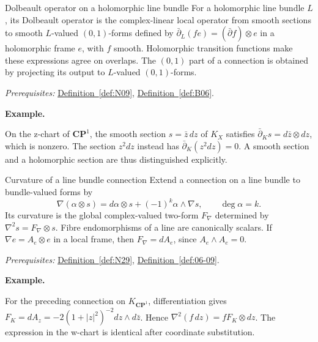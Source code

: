 \documentclass[11pt]{article}
\makeatletter
\newcounter{definition}
\newcommand{\CP}{\mathbf{CP}}
\newcommand{\exampleheading}{\par\medskip\textbf{Example.}\par\smallskip}
\newcommand{\currentdefinition}[1]{\protected@edef\@currentlabel{#1}}
\makeatother
\begin{document}
\begin{definitionbox}{Dolbeault operator on a holomorphic line bundle}
\currentdefinition{\thedefinition}
\label{def:B08}
For a holomorphic line bundle $L$, its Dolbeault operator is the complex-linear local operator from smooth sections to smooth $L$-valued $(0,1)$-forms defined by $\bar\partial_L(fe)=(\bar\partial f)\otimes e$ in a holomorphic frame $e$, with $f$ smooth. Holomorphic transition functions make these expressions agree on overlaps. The $(0,1)$ part of a connection is obtained by projecting its output to $L$-valued $(0,1)$-forms.

\smallskip
\textit{Prerequisites:} \hyperref[def:N09]{Definition~\ref*{def:N09}}, \hyperref[def:B06]{Definition~\ref*{def:B06}}.

\exampleheading
On the z-chart of $\CP^1$, the smooth section $s=\bar z\,dz$ of $K_X$ satisfies $\bar\partial_Ks=d\bar z\otimes dz$, which is nonzero. The section $z^2dz$ instead has $\bar\partial_K(z^2dz)=0$. A smooth section and a holomorphic section are thus distinguished explicitly.
\end{definitionbox}

\begin{definitionbox}{Curvature of a line bundle connection}
\currentdefinition{\thedefinition}
\label{def:B09}
Extend a connection on a line bundle to bundle-valued forms by
\[\nabla(\alpha\otimes s)=d\alpha\otimes s+(-1)^k\alpha\wedge\nabla s,\qquad\deg\alpha=k.\]
Its curvature is the global complex-valued two-form $F_\nabla$ determined by $\nabla^2s=F_\nabla\otimes s$. Fibre endomorphisms of a line are canonically scalars. If $\nabla e=A_e\otimes e$ in a local frame, then $F_\nabla=dA_e$, since $A_e\wedge A_e=0$.

\smallskip
\textit{Prerequisites:} \hyperref[def:N29]{Definition~\ref*{def:N29}}, \hyperref[def:06-09]{Definition~\ref*{def:06-09}}.

\exampleheading
For the preceding connection on $K_{\CP^1}$, differentiation gives $F_K=dA_z=-2(1+|z|^2)^{-2}dz\wedge d\bar z$. Hence $\nabla^2(f\,dz)=fF_K\otimes dz$. The expression in the w-chart is identical after coordinate substitution.
\end{definitionbox}
\end{document}
